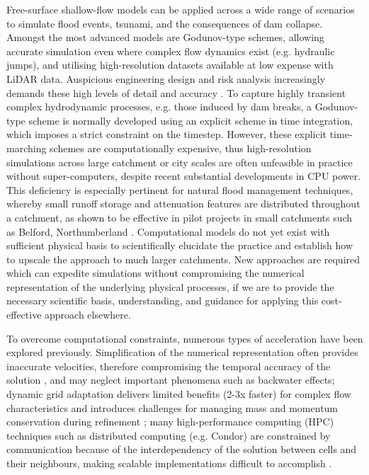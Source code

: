 \documentclass[11pt,english,a4paper]{article}
\begin{document}
Free-surface shallow-flow models can be applied across a wide range of scenarios to simulate flood events, tsunami, and the consequences of dam collapse. Amongst the most advanced models are Godunov-type schemes, allowing accurate simulation even where complex flow dynamics exist (e.g. hydraulic jumps), and utilising high-resolution datasets available at low expense with LiDAR data. Auspicious engineering design and risk analysis increasingly demands these high levels of detail and accuracy \cite{French_03,Haile_05,Marks_00}. To capture highly transient complex hydrodynamic processes, e.g. those induced by dam breaks, a Godunov-type scheme is normally developed using an explicit scheme in time integration, which imposes a strict constraint on the timestep. However, these explicit time-marching schemes are computationally expensive, thus high-resolution simulations across large catchment or city scales are often unfeasible in practice without super-computers, despite recent substantial developments in CPU power. This deficiency is especially pertinent for natural flood management techniques, whereby small runoff storage and attenuation features are distributed throughout a catchment, as shown to be effective in pilot projects in small catchments such as Belford, Northumberland \cite{EnvironmentAgency_12,Wilkinson_10}. Computational models do not yet exist with sufficient physical basis to scientifically elucidate the practice and establish how to upscale the approach to much larger catchments. New approaches are required which can expedite simulations without compromising the numerical representation of the underlying physical processes, if we are to provide the necessary scientific basis, understanding, and guidance for applying this cost-effective approach elsewhere. 

To overcome computational constraints, numerous types of acceleration have been explored previously. Simplification of the numerical representation often provides inaccurate velocities, therefore compromising the temporal accuracy of the solution \cite{Pender_10,Singh_96,Neelz_09}, and may neglect important phenomena such as backwater effects; dynamic grid adaptation delivers limited benefits (2-3x faster) for complex flow characteristics and introduces challenges for managing mass and momentum conservation during refinement \cite{Liang_04}; many high-performance computing (HPC) techniques such as distributed computing (e.g. Condor) are constrained by communication because of the interdependency of the solution between cells and their neighbours, making scalable implementations difficult to accomplish \cite{Pau_06,Delis_09}. 
\end{document}
